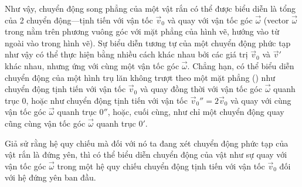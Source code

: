 Như vậy, chuyển động song phẳng của một vật rắn có thể được biểu diễn là tổng của 2 chuyển động---tịnh tiến với vận tốc $\vec{v}_0$ và quay với vận tốc góc $\vec{\omega}$ (vector $\vec{\omega}$ trong  nằm trên phương vuông góc với mặt phẳng của hình vẽ, hướng vào từ ngoài vào trong hình vẽ). Sự biểu diễn tương tự của một chuyển động phức tạp như vậy có thể thực hiện bằng nhiều cách khác nhau bởi các giá trị $\vec{v}_0$ và $\vec{v}'$ khác nhau, nhưng ứng với cùng một vận tốc góc $\vec{\omega}$. Chẳng hạn, có thể biểu diễn chuyển động của một hình trụ lăn không trượt theo một mặt phẳng () như chuyển động tịnh tiến với vận tốc $\vec{v}_0$ và quay đồng thời với vận tốc góc $\vec{\omega}$ quanh trục $0$, hoặc như chuyển động tịnh tiến với vận tốc $\vec{v}_0''=2\vec{v}_0$ và quay với cùng vận tốc góc $\vec{\omega}$ quanh trục $0''$, hoặc, cuối cùng, như chỉ một chuyển động quay cũng cùng vận tốc góc $\vec{\omega}$ quanh trục $0'$.

Giả sử rằng hệ quy chiếu mà đối với nó ta đang xét chuyển động phức tạp của vật rắn là đứng yên, thì có thể biểu diễn chuyển động của vật như sự quay với vận tốc góc $\vec{\omega}$ trong một hệ quy chiếu chuyển động tịnh tiến với vận tốc $\vec{v}_0$ đối với hệ đứng yên ban đầu.

